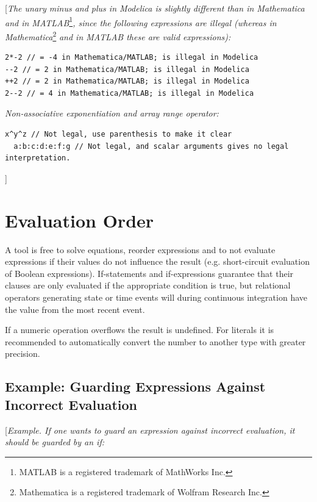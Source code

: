 \documentclass[10pt,a4paper]{report}
\def\doublelabel#1{\label{#1}}
\begin{document}
{[}\emph{The unary minus and plus in Modelica is slightly different than
in Mathematica and in MATLAB}\footnote{MATLAB is a registered trademark
  of MathWorks Inc.}\emph{, since the following expressions are illegal
(whereas in Mathematica}\footnote{Mathematica is a registered trademark
  of Wolfram Research Inc.} \emph{and in MATLAB these are valid
expressions):}
\begin{lstlisting}[language=modelica]
2*-2 // = -4 in Mathematica/MATLAB; is illegal in Modelica
--2 // = 2 in Mathematica/MATLAB; is illegal in Modelica
++2 // = 2 in Mathematica/MATLAB; is illegal in Modelica
2--2 // = 4 in Mathematica/MATLAB; is illegal in Modelica
\end{lstlisting}

\emph{Non-associative exponentiation and array range operator:}

\begin{lstlisting}[language=modelica]
  x^y^z // Not legal, use parenthesis to make it clear
  a:b:c:d:e:f:g // Not legal, and scalar arguments gives no legal interpretation.
\end{lstlisting}
{]}

\section{Evaluation Order}\doublelabel{evaluation-order}

A tool is free to solve equations, reorder expressions and to not
evaluate expressions if their values do not influence the result (e.g.
short-circuit evaluation of Boolean expressions). If-statements and
if-expressions guarantee that their clauses are only evaluated if the
appropriate condition is true, but relational operators generating state
or time events will during continuous integration have the value from
the most recent event.

If a numeric operation overflows the result is undefined. For literals
it is recommended to automatically convert the number to another type
with greater precision.

\subsection{Example: Guarding Expressions Against Incorrect Evaluation}\doublelabel{example-guarding-expressions-against-incorrect-evaluation}

{[}\emph{Example. If one wants to guard an expression against incorrect
evaluation, it should be guarded by an if:}
\end{document}
